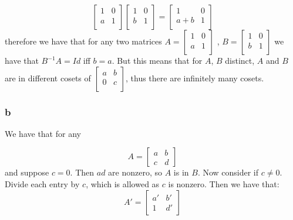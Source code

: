 \documentclass[]{article}
\begin{document}
\begin{equation}
	\begin{bmatrix}
		1 & 0\\
		a & 1\\
	\end{bmatrix}
	\begin{bmatrix}
		1 & 0\\
		b & 1\\
	\end{bmatrix}
	=
	\begin{bmatrix}
		1 & 0\\
		a + b & 1\\
	\end{bmatrix}
\end{equation}
therefore we have that for any two matrices $A = \begin{bmatrix}
	1 & 0\\
	a & 1\\
\end{bmatrix}
$
, $B = 
\begin{bmatrix}
	1 & 0\\
	b & 1\\
\end{bmatrix}
$
we have that $B^{-1} A = Id$ iff $b = a$. But this means that for $A$, $B$ distinct, $A$ and $B$ are in different cosets of $
\begin{bmatrix}
	a & b\\
	0 & c\\
\end{bmatrix}
$, thus there are infinitely many cosets. 

\subsubsection*{b}
We have that for any 

\begin{equation}
	A = \begin{bmatrix}
		a & b\\
		c & d
	\end{bmatrix}
\end{equation}
and suppose $c = 0$. Then $a d$ are nonzero, so $A$ is in $B$. Now consider if $c \neq 0$. Divide each entry by $c$, which is allowed as $c$ is nonzero. Then we have that:
\begin{equation}
	A' = \begin{bmatrix}
		a' & b'\\
		1 & d'
	\end{bmatrix}
\end{equation}
\end{document}
